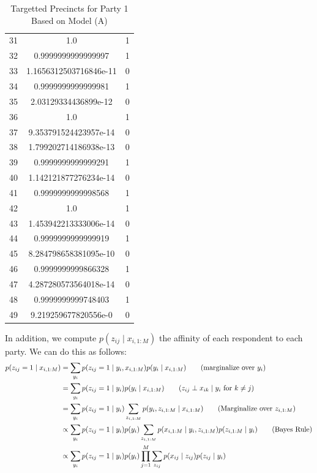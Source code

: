 \documentclass[12pt]{article}
\begin{document}
\begin{enumerate}[label=(\Alph*)]
\begin{enumerate}[label=(\roman*)]
\begin{table}
\begin{tabular}{ |c|c|c| }
						 31 &  1.0 & 1 \\
						 32 &  0.9999999999999997 & 1 \\
						 33 &  1.1656312503716846e-11 & 0 \\
						 34 &  0.9999999999999981 & 1 \\
						 35 &  2.03129334436899e-12 & 0 \\
						 36 &  1.0 & 1 \\
						 37 &  9.353791524423957e-14 & 0 \\
						 38 &  1.799202714186938e-13 & 0 \\
						 39 &  0.9999999999999291 & 1 \\
						 40 &  1.142121877276234e-14 & 0 \\
						 41 &  0.9999999999998568 & 1 \\
						 42 &  1.0 & 1 \\
						 43 &  1.453942213333006e-14 & 0 \\
						 44 &  0.9999999999999919 & 1 \\
						 45 &  8.284798658381095e-10 & 0 \\
						 46 &  0.9999999999866328 & 1 \\
						 47 &  4.287280573564018e-14 & 0 \\
						 48 &  0.9999999999748403 & 1 \\
						 49 &  9.219259677820556e-0 & 0\\
					 \hline
				\end{tabular}
  			\caption{Targetted Precincts for Party 1 Based on Model (A)}
  			\label{tab:targets_1}
  		\end{table}
  		In addition, we compute $p(z_{ij} \mid x_{i, 1:M})$ the affinity of each respondent to each party. We can do this as follows:
  		\begin{align*}
  			p(z_{ij} = 1 \mid x_{i, 1:M}) &= \sum_{y_i} p(z_{ij} = 1 \mid y_i, x_{i,1:M})p(y_i \mid x_{i, 1:M}) \tag{marginalize over $y_i$} \\
  			&= \sum_{y_i} p(z_{ij} = 1 \mid y_i)p(y_i \mid x_{i,1:M}) \tag{$z_{ij} \perp x_{ik} \mid y_i$ for $k \neq j$} \\
  			&= \sum_{y_i} p(z_{ij} = 1 \mid y_i) \sum_{z_{i,1:M}} p(y_i, z_{i, 1:M} \mid x_{i,1:M}) \tag{Marginalize over $z_{i,1:M}$} \\
  			&\propto  \sum_{y_i} p(z_{ij} = 1 \mid y_i)p(y_i) \sum_{z_{i, 1:M}} p(x_{i,1:M} \mid y_i, z_{i,1:M})p(z_{i, 1:M} \mid y_i) \tag{Bayes Rule} \\
  			&\propto \sum_{y_i} p(z_{ij} = 1 \mid y_i)p(y_i) \prod_{j=1}^M \sum_{z_{ij}} p(x_{ij} \mid z_{ij})p(z_{ij} \mid y_i)
  		\end{align*}



\end{enumerate}
\end{enumerate}
\end{document}
